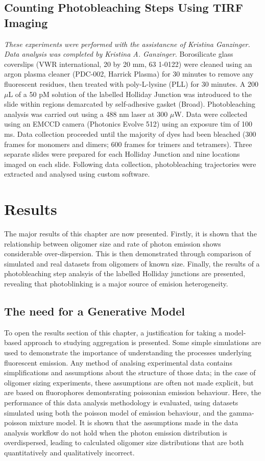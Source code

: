 \subsection{Counting Photobleaching Steps Using TIRF Imaging}
\textit{These experiments were performed with the assistancne of Kristina Ganzinger. Data analysis was completed by Kristina A. Ganzinger.}
Borosilicate glass coverslips (VWR international, 20 by 20 mm, 63 1-0122) were cleaned using an argon plasma cleaner (PDC-002, Harrick Plasma) for 30 minutes to remove any fluorescent residues, then treated with poly-L-lysine (PLL) for 30 minutes. A 200 $\mu$L of a 50 pM solution of the labelled Holliday Junction was introduced to the slide within regions demarcated by self-adhesive gasket (Broad). Photobleaching analysis was carried out using a 488 nm laser at 300 $\mu$W. Data were collected using an EMCCD camera (Photonics Evolve 512) using an exposure tim of 100 ms. Data collection proceeded until the majority of dyes had been bleached (300 frames for monomers and dimers; 600 frames for trimers and tetramers). Three separate slides were prepared for each Holliday Junction and nine locations imaged on each slide. Following data collection, photobleaching trajectories were extracted and analysed using custom software.

\section{Results}
The major results of this chapter are now presented. Firstly, it is shown that the relationship between oligomer size and rate of photon emission shows considerable over-dispersion. This is then demonstrated through comparison of simulated and real datasets from oligomers of known size. Finally, the results of a photobleaching step analsyis of the labelled Holliday junctions are presented, revealing that photoblinking is a major source of emision heterogeneity.

\subsection{The need for a Generative Model}
\label{sect:generative_model}
To open the results section of this chapter, a justification for taking a model-based approach to studying aggregation is presented. Some simple simulations are used to demonstrate the importance of understanding the processes underlying fluorescent emission. Any method of analsing experimental data contains simplifications and assumptions about the structure of those data; in the case of oligomer sizing experiments, these assumptions are often not made explicit, but are based on fluorophores demontsrating poissonian emission behaviour. Here, the performance of this data analysis methodology is evaluated, using datasets simulated using both the poisson model of emission behaviour, and the gamma-poisson mixture model. It is shown that the assumptions made in the data analysis workflow do not hold when the photon emission distribution is overdispersed, leading to calculated oligomer size distributions that are both quantitatively and qualitatively incorrect. 

